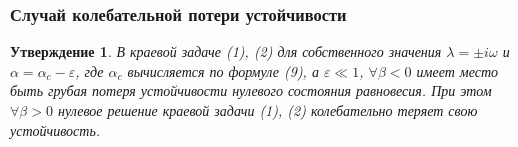 \documentclass[fullscreen=true, unicode, bookmarks=false]{beamer}
\newtheorem{rustheorem}{Утверждение }
\begin{document}
\begin{frame}
\frametitle{ Случай колебательной потери устойчивости }

\begin{rustheorem}
В краевой задаче (1), (2) для собственного значения $ \lambda = \pm i \omega $ и $ \alpha = \alpha_c - \varepsilon $, где $ \alpha_c $ вычисляется по формуле (9), а $ \varepsilon \ll 1 $, $ \forall \beta < 0 $ имеет место быть грубая потеря устойчивости нулевого состояния равновесия. При этом $ \forall \beta > 0 $ нулевое решение краевой задачи (1), (2) колебательно теряет свою устойчивость.
\end{rustheorem}

\end{frame}
\end{document}
